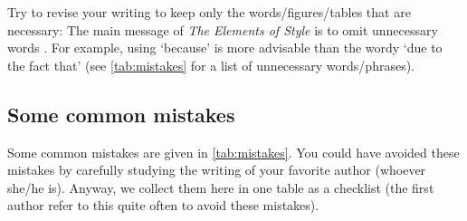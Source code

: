 \documentclass[authoryear,12pta4paper,fleqn]{article}
\numberwithin{equation}{section}
\theoremstyle{remark}
\begin{document}
Try to revise your writing to keep only the words/figures/tables that are necessary: The main message of \textit{The Elements of Style} is to omit unnecessary words \citep{strunk2007elements}. For example, using `because' is more advisable than the wordy `due to the fact that' (see \cref{tab:mistakes} for a list of unnecessary words/phrases).


% 
\subsection{Some common mistakes}\label{sec:mistakes}


Some common mistakes are given in \cref{tab:mistakes}. You could have avoided these mistakes by carefully studying the writing of your favorite author (whoever she/he is). Anyway, we collect them here in one table as a checklist (the first author refer to this quite often to avoid these mistakes).
\end{document}
